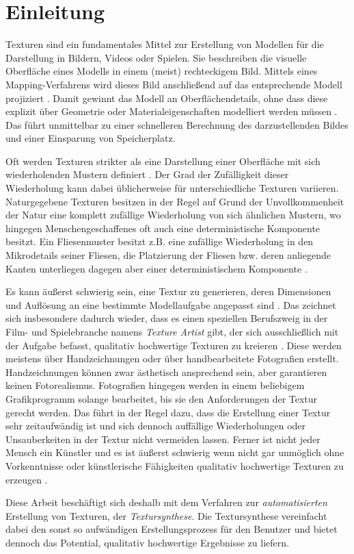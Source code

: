 \section{Einleitung}

Texturen sind ein fundamentales Mittel zur Erstellung von Modellen für die Darstellung in Bildern, Videos oder Spielen.
Sie beschreiben die visuelle Oberfläche eines Modells in einem (meist) rechteckigem Bild.
Mittels eines Mapping-Verfahrens wird dieses Bild anschließend auf das entsprechende Modell projiziert \cite{SelfTuning}.
Damit gewinnt das Modell an Oberflächendetails, ohne dass diese explizit über Geometrie oder Materialeigenschaften modelliert werden müssen \cite{StateOfTheArt}.
Das führt unmittelbar zu einer schnelleren Berechnung des darzustellenden Bildes und einer Einsparung von Speicherplatz.

Oft werden Texturen strikter als eine Darstellung einer Oberfläche mit sich wiederholenden Mustern definiert \cite{StateOfTheArt}.
Der Grad der Zufälligkeit dieser Wiederholung kann dabei üblicherweise für unterschiedliche Texturen variieren.
Naturgegebene Texturen besitzen in der Regel auf Grund der Unvollkommenheit der Natur eine komplett zufällige Wiederholung von sich ähnlichen Mustern, wo hingegen Menschengeschaffenes oft auch eine deterministische Komponente besitzt.
Ein Fliesenmuster besitzt z.B. eine zufällige Wiederholung in den Mikrodetails seiner Fliesen, die Platzierung der Fliesen bzw. deren anliegende Kanten unterliegen dagegen aber einer deterministischem Komponente \cite{StateOfTheArt}.

Es kann äußerst schwierig sein, eine Textur zu generieren, deren Dimensionen und Auflösung an eine bestimmte Modellaufgabe angepasst sind \cite{SelfTuning}.
Das zeichnet sich insbesondere dadurch wieder, dass es einen speziellen Berufszweig in der Film- und Spielebranche namens \emph{Texture Artist} gibt, der sich ausschließlich mit der Aufgabe befasst, qualitativ hochwertige Texturen zu kreieren \cite{StateOfTheArt}.
Diese werden meistens über Handzeichnungen oder über handbearbeitete Fotografien erstellt.
Handzeichnungen können zwar ästhetisch ansprechend sein, aber garantieren keinen Fotorealismus.
Fotografien hingegen werden in einem beliebigem Grafikprogramm solange bearbeitet, bis sie den Anforderungen der Textur gerecht werden.
Das führt in der Regel dazu, dass die Erstellung einer Textur sehr zeitaufwändig ist und sich dennoch auffällige Wiederholungen oder Unsauberkeiten in der Textur nicht vermeiden lassen.
Ferner ist nicht jeder Mensch ein Künstler und es ist äußerst schwierig wenn nicht gar unmöglich ohne Vorkenntnisse oder künstlerische Fähigkeiten qualitativ hochwertige Texturen zu erzeugen \cite{StateOfTheArt}.

Diese Arbeit beschäftigt sich deshalb mit dem Verfahren zur \emph{automatisierten} Erstellung von Texturen, der \emph{Textursynthese}.
Die Textursynthese vereinfacht dabei den sonst so aufwändigen Erstellungsprozess für den Benutzer und bietet dennoch das Potential, qualitativ hochwertige Ergebnisse zu liefern.